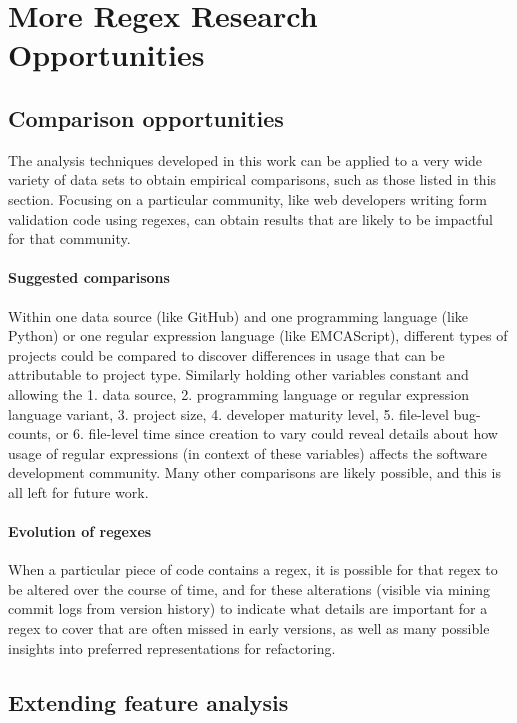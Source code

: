 \section{More Regex Research Opportunities}

\subsection{Comparison opportunities}
The analysis techniques developed in this work can be applied to a very wide variety of data sets to obtain empirical comparisons, such as those listed in this section.  Focusing on a particular community, like web developers writing form validation code using regexes, can obtain results that are likely to be impactful for that community.

\paragraph{Suggested comparisons}  Within one data source (like GitHub) and one programming language (like Python) or one regular expression language (like EMCAScript), different types of projects could be compared to discover differences in usage that can be attributable to project type.  Similarly holding other variables constant and allowing the 1. data source, 2. programming language or regular expression language variant, 3. project size, 4. developer maturity level, 5. file-level bug-counts,  or 6. file-level time since creation to vary could reveal details about how usage of regular expressions (in context of these variables) affects the software development community. Many other comparisons are likely possible, and this is all left for future work.

\paragraph{Evolution of regexes}  When a particular piece of code contains a regex, it is possible for that regex to be altered over the course of time, and for these alterations (visible via mining commit logs from version history) to indicate what details are important for a regex to cover that are often missed in early versions, as well as many possible insights into preferred representations for refactoring.


\subsection{Extending feature analysis}
